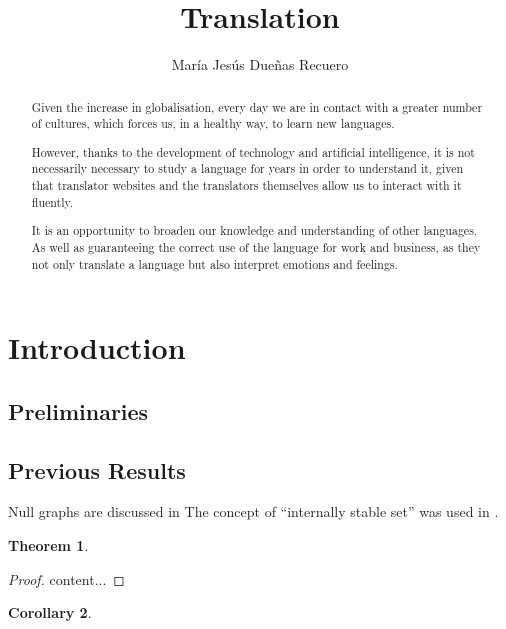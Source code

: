 \documentclass[a4paper]{article}
\title{Translation}
\author{María Jesús Dueñas Recuero}
\date{

 \\ \texttt{MJesus.duenas1@alu.uclm.es}\\[2ex]%
}
\theoremstyle{plain}
\newtheorem{theorem}{Theorem}
\newtheorem{corollary}[theorem]{Corollary}
\theoremstyle{definition}
\begin{document}
	\maketitle
	\newpage
	\begin{abstract}
		Given the increase in globalisation, every day we are in contact with a greater number of cultures, which forces us, in a healthy way, to learn new languages.

	However, thanks to the development of technology and artificial intelligence, it is not necessarily necessary to study a language for years in order to understand it, given that translator websites and the translators themselves allow us to interact with it fluently.

	It is an opportunity to broaden our knowledge and understanding of other languages. As well as guaranteeing the correct use of the language for work and business, as they not only translate a language but also interpret emotions and feelings.


	\end{abstract}
	\newpage
	\tableofcontents
	\newpage
	\section{Introduction}
	\label{sec:intro}
	
	\lipsum[2]
	
	\subsection{Preliminaries}
	\label{sec:pre}
	
	\lipsum[3]
	
	\subsection{Previous Results}
	\label{sec:prev-results}
	
	Null graphs are discussed in \cite{HararyR74}
	The concept of ``internally stable set'' was used in \cite{Berge57, Berge58}.
	
	\begin{theorem}
		\label{thrm:1}
		\lipsum[4]
	\end{theorem}
	\begin{proof}
		content...
	\end{proof}

	\begin{corollary}
	\label{cor:1}
	
	\lipsum[5]
	\end{corollary}
\end{document}
